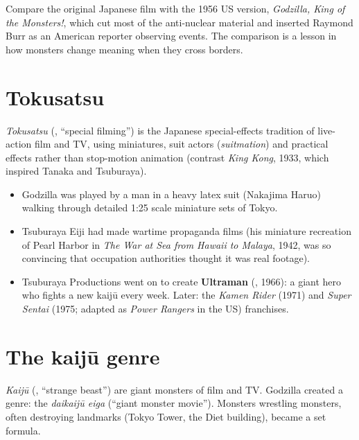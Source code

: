 \begin{aside}
Compare the original Japanese film with the 1956 US version,
\emph{Godzilla, King of the Monsters!}, which cut most of the anti-nuclear material and
inserted Raymond Burr as an American reporter observing events. The comparison is a lesson
in how monsters change meaning when they cross borders.
\end{aside}

\section{Tokusatsu}

\begin{definition}[Tokusatsu]
\emph{Tokusatsu} (, ``special filming'') is the Japanese special-effects tradition
of live-action film and TV, using miniatures, suit actors (\emph{suitmation}) and practical
effects rather than stop-motion animation (contrast \emph{King Kong}, 1933, which inspired
Tanaka and Tsuburaya).
\end{definition}

\begin{itemize}
  \item Godzilla was played by a man in a heavy latex suit (Nakajima Haruo) walking through
        detailed 1:25 scale miniature sets of Tokyo.
  \item Tsuburaya Eiji had made wartime propaganda films (his miniature recreation of
        Pearl Harbor in \emph{The War at Sea from Hawaii to Malaya}, 1942, was so convincing
        that occupation authorities thought it was real footage).
  \item Tsuburaya Productions went on to create \textbf{Ultraman} (, 1966):
        a giant hero who fights a new kaijū every week. Later: the \emph{Kamen Rider}
        (1971) and \emph{Super Sentai} (1975; adapted as \emph{Power Rangers} in the US)
        franchises.
\end{itemize}

\section{The kaijū genre}

\begin{definition}[Kaijū]
\emph{Kaijū} (, ``strange beast'') are giant monsters of film and TV. Godzilla
created a genre: the \emph{daikaijū eiga} (``giant monster movie''). Monsters wrestling
monsters, often destroying landmarks (Tokyo Tower, the Diet building), became a set formula.
\end{definition}

